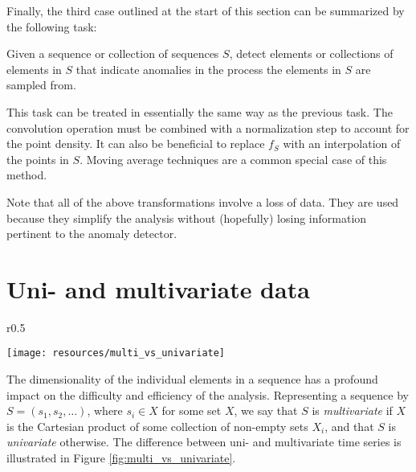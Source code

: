 Finally, the third case outlined at the start of this section can be summarized by the following task: 

\begin{task}
  \label{task:continuous_anomaly_detection}
  Given a sequence or collection of sequences $S$, detect elements or collections of elements in $S$ that indicate anomalies in the process the elements in $S$ are sampled from.
\end{task}

This task can be treated in essentially the same way as the previous task. The convolution operation must be combined with a normalization step to account for the point density. It can also be beneficial to replace $f_S$ with an interpolation of the points in $S$. Moving average techniques are a common special case of this method.

Note that all of the above transformations involve a loss of data. They are used because they simplify the analysis without (hopefully) losing information pertinent to the anomaly detector.

\section{Uni- and multivariate data}
\label{sect:unimultivariate}

\begin{wrapfigure}{r}{0.5\textwidth}
    \vspace{-25pt}
    \begin{center}
        \leavevmode
        \texttt{[image: resources/multi\_vs\_univariate]}
    \end{center}
    \vspace{-15pt}
    \caption{{\small Two sine curves regarded as two separate univariate time series (dotted lines) and as one multivariate time series (solid lines).}}
    \label{fig:multi_vs_univariate}
    \vspace{-25pt}
\end{wrapfigure}

The dimensionality of the individual elements in a sequence has a profound impact on the difficulty and efficiency of the analysis. Representing a sequence by $S = (s_1, s_2, \dots)$, where $s_i \in X$ for some set $X$, we say that $S$ is \emph{multivariate} if $X$ is the Cartesian product of some collection of non-empty sets $X_i$, and that $S$ is \emph{univariate} otherwise. The difference between uni- and multivariate time series is illustrated in Figure \ref{fig:multi_vs_univariate}.

